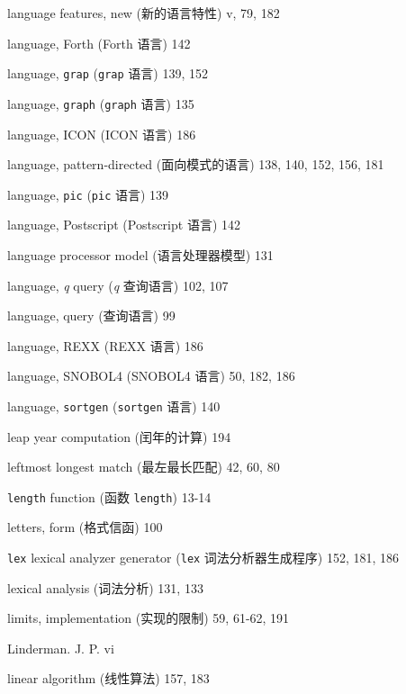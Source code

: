 \begin{multicols}{2}
\hangindent=2pc  language features, new (新的语言特性) v, 79, 182

\hangindent=2pc  language, Forth (Forth 语言) 142

\hangindent=2pc  language, \verb'grap' (\verb'grap' 语言) 139, 152

\hangindent=2pc  language, \verb'graph' (\verb'graph' 语言) 135

\hangindent=2pc  language, ICON (ICON 语言) 186

\hangindent=2pc  language, pattern-directed (面向模式的语言) 138, 140, 152, 156, 181

\hangindent=2pc  language, \verb'pic' (\verb'pic' 语言) 139

\hangindent=2pc  language, Postscript (Postscript 语言) 142

\hangindent=2pc  language processor model (语言处理器模型) 131

\hangindent=2pc  language, \textit{q} query (\textit{q}
查询语言) 102, 107

\hangindent=2pc  language, query (查询语言) 99

\hangindent=2pc  language, REXX (REXX 语言) 186

\hangindent=2pc  language, SNOBOL4 (SNOBOL4 语言) 50, 182, 186

\hangindent=2pc  language, \verb'sortgen' (\verb'sortgen' 语言) 140

\hangindent=2pc  leap year computation (闰年的计算) 194

\hangindent=2pc  leftmost longest match (最左最长匹配) 42, 60, 80

\hangindent=2pc  \verb'length' function (函数 \verb'length') 13-14

\hangindent=2pc  letters, form (格式信函) 100

\hangindent=2pc  \verb'lex' lexical analyzer generator
(\verb'lex' 词法分析器生成程序) 152, 181, 186

\hangindent=2pc  lexical analysis (词法分析) 131, 133

\hangindent=2pc  limits, implementation (实现的限制) 59, 61-62, 191

\hangindent=2pc  Linderman. J. P. vi

\hangindent=2pc  linear algorithm (线性算法) 157, 183


\end{multicols}
